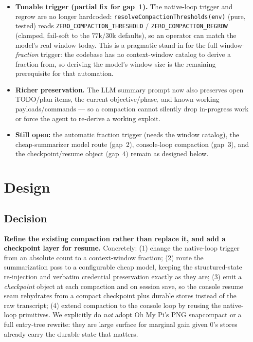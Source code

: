 \documentclass[11pt]{article}
\begin{document}
\begin{itemize}[leftmargin=1.6em]
\item \textbf{Tunable trigger (partial fix for gap~1).} The native-loop trigger
and regrow are no longer hardcoded: \texttt{resolveCompactionThresholds(env)}
(pure, tested) reads \texttt{ZERO\_COMPACTION\_THRESHOLD} /
\texttt{ZERO\_COMPACTION\_REGROW} (clamped, fail-soft to the $77$k/$30$k
defaults), so an operator can match the model's real window today. This is a
pragmatic stand-in for the full window-\emph{fraction} trigger: the codebase has
no context-window catalog to derive a fraction from, so deriving the model's
window size is the remaining prerequisite for that automation.
\item \textbf{Richer preservation.} The LLM summary prompt now also preserves
open TODO/plan items, the current objective/phase, and known-working
payloads/commands --- so a compaction cannot silently drop in-progress work or
force the agent to re-derive a working exploit.
\item \textbf{Still open:} the automatic fraction trigger (needs the window
catalog), the cheap-summarizer model route (gap~2), console-loop compaction
(gap~3), and the checkpoint/resume object (gap~4) remain as designed below.
\end{itemize}

\section{Design}

\subsection{Decision}

\textbf{Refine the existing compaction rather than replace it, and add a
checkpoint layer for resume.} Concretely: (1) change the native-loop trigger from
an absolute count to a context-window fraction; (2) route the summarization pass
to a configurable cheap model, keeping the structured-state re-injection and
verbatim credential preservation exactly as they are; (3) emit a
\emph{checkpoint} object at each compaction and on session save, so the console
resume seam rehydrates from a compact checkpoint plus durable stores instead of
the raw transcript; (4) extend compaction to the console loop by reusing the
native-loop primitives. We explicitly do \emph{not} adopt Oh My Pi's PNG
snapcompact or a full entry-tree rewrite: they are large surface for marginal
gain given 0's stores already carry the durable state that matters.
\end{document}
